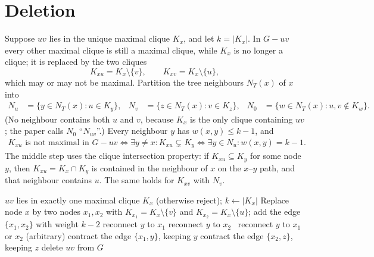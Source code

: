 \documentclass[11pt,a4paper,oneside]{report}
\theoremstyle{plain}
\theoremstyle{definition}
\theoremstyle{remark}
\newcommand{\op}[1]{\textsf{#1}}
\begin{document}
\section{Deletion}\label{sec:delete-math}
Suppose \(uv\) lies in the unique maximal clique \(K_x\), and let \(k=|K_x|\). In \(G-uv\) every
other maximal clique is still a maximal clique, while \(K_x\) is no longer a clique; it is
replaced by the two cliques
\[ K_{xu}=K_x\setminus\{v\},\qquad K_{xv}=K_x\setminus\{u\}, \]
which may or may not be maximal. Partition the tree neighbours \(N_T(x)\) of \(x\) into
\begin{align*}
N_u&=\{y\in N_T(x): u\in K_y\}, & N_v&=\{z\in N_T(x): v\in K_z\}, &
N_0&=\{w\in N_T(x): u,v\notin K_w\}.
\end{align*}
(No neighbour contains both \(u\) and \(v\), because \(K_x\) is the only clique containing
\(uv\); the paper calls \(N_0\) ``\(N_{uv}\)''.) Every neighbour \(y\) has \(w(x,y)\le k-1\), and
\begin{align}\label{eq:delete-maximal}
K_{xu}\text{ is not maximal in }G-uv
\iff \exists y\ne x: K_{xu}\subsetneq K_y
\iff \exists y\in N_u: w(x,y)=k-1 .
\end{align}
The middle step uses the clique intersection property: if \(K_{xu}\subseteq K_y\) for some node
\(y\), then \(K_{xu}=K_x\cap K_y\) is contained in the neighbour of \(x\) on the \(x\)--\(y\) path,
and that neighbour contains \(u\). The same holds for \(K_{xv}\) with \(N_v\).

\begin{algorithm}[ht]
\caption{\op{Delete}\((u,v)\) (Ibarra \S3.2, p.\,40:8)}\label{alg:delete}
\begin{algorithmic}[1]
\Require \(uv\) lies in exactly one maximal clique \(K_x\) (otherwise reject); \(k\gets|K_x|\)
\State Replace node \(x\) by two nodes \(x_1,x_2\) with \(K_{x_1}=K_x\setminus\{v\}\) and
  \(K_{x_2}=K_x\setminus\{u\}\); add the edge \(\{x_1,x_2\}\) with weight \(k-2\)
   reconnect \(y\) to \(x_1\)
   reconnect \(y\) to \(x_2\)
  \Else\ reconnect \(y\) to \(x_1\) or \(x_2\) (arbitrary)
  \EndIf
\EndFor
{} contract the edge \(\{x_1,y\}\), keeping \(y\)\EndIf
{} contract the edge \(\{x_2,z\}\), keeping \(z\)\EndIf
\State delete \(uv\) from \(G\)
\end{algorithmic}
\end{algorithm}
\end{document}
